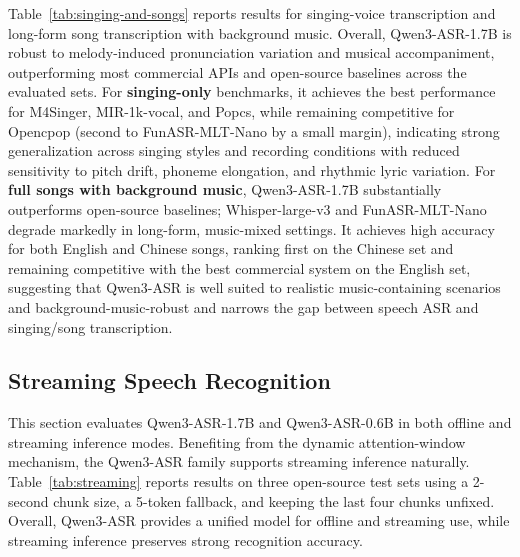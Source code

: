 Table~\ref{tab:singing-and-songs} reports results for singing-voice transcription and long-form song transcription with background music. Overall, Qwen3-ASR-1.7B is robust to melody-induced pronunciation variation and musical accompaniment, outperforming most commercial APIs and open-source baselines across the evaluated sets. For \textbf{singing-only} benchmarks, it achieves the best performance for M4Singer, MIR-1k-vocal, and Popcs, while remaining competitive for Opencpop (second to FunASR-MLT-Nano by a small margin), indicating strong generalization across singing styles and recording conditions with reduced sensitivity to pitch drift, phoneme elongation, and rhythmic lyric variation. For \textbf{full songs with background music}, Qwen3-ASR-1.7B substantially outperforms open-source baselines; Whisper-large-v3 and FunASR-MLT-Nano degrade markedly in long-form, music-mixed settings. It achieves high accuracy for both English and Chinese songs, ranking first on the Chinese set and remaining competitive with the best commercial system on the English set, suggesting that Qwen3-ASR is well suited to realistic music-containing scenarios and background-music-robust and narrows the gap between speech ASR and singing/song transcription.

\subsection{Streaming Speech Recognition}

This section evaluates Qwen3-ASR-1.7B and Qwen3-ASR-0.6B in both offline and streaming inference modes. Benefiting from the dynamic attention-window mechanism, the Qwen3-ASR family supports streaming inference naturally. Table~\ref{tab:streaming} reports results on three open-source test sets using a 2-second chunk size, a 5-token fallback, and keeping the last four chunks unfixed. Overall, Qwen3-ASR provides a unified model for offline and streaming use, while streaming inference preserves strong recognition accuracy.

\begin{table}[ht]
\centering
\caption{\textbf{ASR performance of the two inference modes on three open-source benchmarks.}}
\label{tab:streaming}
\end{table}

